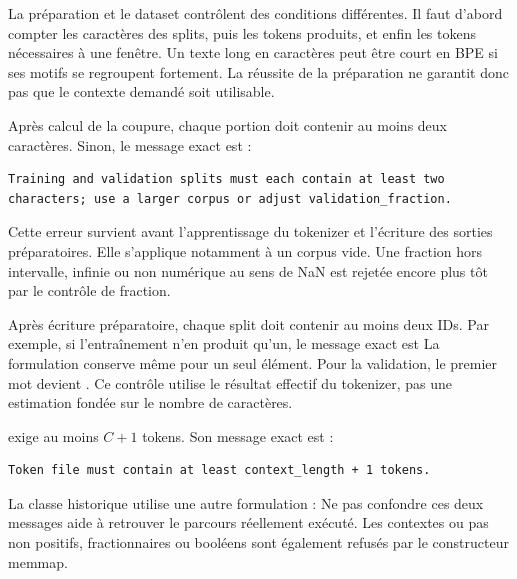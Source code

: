 
La préparation et le dataset contrôlent des conditions différentes.
Il faut d'abord compter les caractères des splits, puis les tokens produits,
et enfin les tokens nécessaires à une fenêtre. Un texte long en caractères
peut être court en BPE si ses motifs se regroupent fortement.
La réussite de la préparation ne garantit donc pas que le contexte demandé
soit utilisable.

Après calcul de la coupure, chaque portion doit contenir au moins deux
caractères. Sinon, le message exact est :
\begin{lstlisting}[basicstyle=\ttfamily\footnotesize,breaklines=true]
Training and validation splits must each contain at least two characters; use a larger corpus or adjust validation_fraction.
\end{lstlisting}
Cette erreur survient avant l'apprentissage du tokenizer et l'écriture
des sorties préparatoires. Elle s'applique notamment à un corpus vide.
Une fraction hors intervalle, infinie ou non numérique au sens de NaN
est rejetée encore plus tôt par le contrôle de fraction.

Après écriture préparatoire, chaque split doit contenir au moins deux IDs.
Par exemple, si l'entraînement n'en produit qu'un, le message exact est
La formulation conserve  même pour un seul élément.
Pour la validation, le premier mot devient .
Ce contrôle utilise le résultat effectif du tokenizer, pas une estimation
fondée sur le nombre de caractères.

 exige au moins \(C+1\) tokens.
Son message exact est :
\begin{lstlisting}[basicstyle=\ttfamily\footnotesize,breaklines=true]
Token file must contain at least context_length + 1 tokens.
\end{lstlisting}
La classe historique utilise une autre formulation :
Ne pas confondre ces deux messages aide à retrouver le parcours réellement
exécuté. Les contextes ou pas non positifs, fractionnaires ou booléens
sont également refusés par le constructeur memmap.

